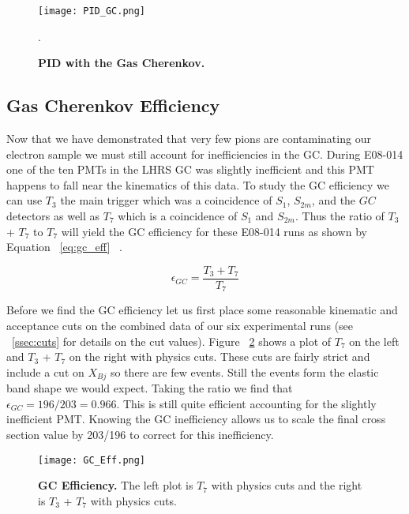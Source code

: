 \begin{figure}[!ht]
\begin{center}
\texttt{[image: PID\_GC.png]}
\end{center}
\caption{
{\bf{PID with the Gas Cherenkov.}} }.
\label{fig:pid_gc}
\end{figure}

\subsection{Gas Cherenkov Efficiency}
\label{ssec:gc_eff}

Now that we have demonstrated that very few pions are contaminating our electron sample we must still account for inefficiencies in the GC. During E08-014 one of the ten PMTs in the LHRS GC was slightly inefficient and this PMT happens to fall near the kinematics of this data. To study the GC efficiency we can use $T_3$ the main trigger which was a coincidence of $S_1$, $S_{2m}$, and the $GC$ detectors as well as $T_7$ which is a coincidence of $S_1$ and $S_{2m}$. Thus the ratio of $T_3$ + $T_7$ to $T_7$ will yield the GC efficiency for these E08-014 runs as shown by Equation ~\ref{eq:gc_eff} ~\cite{dien_gc}. 

\begin{equation} \label{eq:gc_eff}
	\epsilon_{GC} = \frac{T_3+T_7}{T_7}
\end{equation}

Before we find the GC efficiency let us first place some reasonable kinematic and acceptance cuts on the combined data of our six experimental runs (see ~\ref{ssec:cuts} for details on the cut values). Figure ~\ref{fig:gc_eff} shows a plot of $T_7$ on the left and $T_3$ + $T_7$ on the right with physics cuts. These cuts are fairly strict and include a cut on $X_{Bj}$ so there are few events. Still the events form the elastic band shape we would expect. Taking the ratio we find that $\epsilon_{GC} = 196/203 = 0.966$. This is still quite efficient accounting for the slightly inefficient PMT. Knowing the GC inefficiency allows us to scale the final cross section value by 203/196 to correct for this inefficiency.

\begin{figure}[!ht]
\begin{center}
\texttt{[image: GC\_Eff.png]}
\end{center}
\caption{
{\bf{GC Efficiency.}} The left plot is $T_7$ with physics cuts and the right is $T_3$ + $T_7$ with physics cuts.}
\label{fig:gc_eff}
\end{figure}

